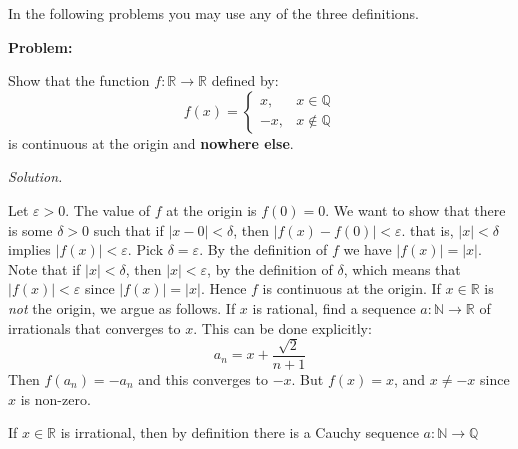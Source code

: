 \documentclass{article}
\theoremstyle{normal}
\newif\ifsolution
\begin{document}
        \par\hfill\par
        In the following problems you may use any of the three definitions.
        \par\hfill\par
        \textbf{Problem:}
        \par\hfill\par
        Show that the function $f:\mathbb{R}\rightarrow\mathbb{R}$ defined by:
        \begin{equation}
            f(x)
            =\begin{cases}
                x,&x\in\mathbb{Q}\\
                -x,&x\not\in\mathbb{Q}
            \end{cases}
        \end{equation}
        is continuous at the origin and \textbf{nowhere else}.
        \par\hfill\par
        \ifsolution
            \color{blue}
            \textit{Solution.}
            \par\hfill\par
            Let $\varepsilon>0$. The value of $f$ at the origin is
            $f(0)=0$. We want to show that there is some $\delta>0$ such that
            if $|x-0|<\delta$, then $|f(x)-f(0)|<\varepsilon$. that is,
            $|x|<\delta$ implies $|f(x)|<\varepsilon$.
            Pick $\delta=\varepsilon$. By the definition of $f$ we have
            $|f(x)|=|x|$. Note that if $|x|<\delta$, then
            $|x|<\varepsilon$, by the definition of $\delta$, which means that
            $|f(x)|<\varepsilon$ since $|f(x)|=|x|$. Hence $f$ is continuous
            at the origin. If $x\in\mathbb{R}$ is \textit{not} the origin,
            we argue as follows. If $x$ is rational, find a sequence
            $a:\mathbb{N}\rightarrow\mathbb{R}$ of irrationals that
            converges to $x$. This can be done explicitly:
            \begin{equation}
                a_{n}=x+\frac{\sqrt{2}}{n+1}
            \end{equation}
            Then $f(a_{n})=-a_{n}$ and this converges to $-x$. But
            $f(x)=x$, and $x\ne{-x}$ since $x$ is non-zero.
            \par\hfill\par
            If $x\in\mathbb{R}$ is irrational, then by definition
            there is a Cauchy sequence $a:\mathbb{N}\rightarrow\mathbb{Q}$
\end{document}
